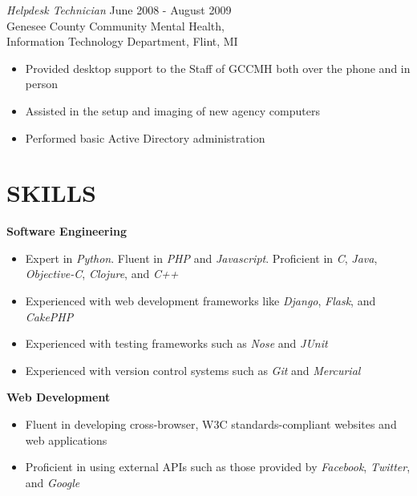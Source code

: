 \documentclass[line,margin]{res}
\begin{document}
\begin{resume}
    {\sl Helpdesk Technician}
            \hfill June 2008 - August 2009 \\
                   Genesee County Community Mental Health, \\
                   Information Technology Department, Flint, MI
        \vspace{2 mm}
        \begin{itemize}
            \item Provided desktop support to the Staff of GCCMH both
                  over the phone and in person
            \item Assisted in the setup and imaging of new agency
                  computers
            \item Performed basic Active Directory administration
        \end{itemize}


\section{SKILLS}
    \textbf{Software Engineering} \vspace{2 mm}
    \begin{itemize}
        \item Expert in {\sl Python}.
              Fluent in {\sl PHP} and {\sl Javascript}.
              Proficient in {\sl C}, {\sl Java}, {\sl Objective-C},
                {\sl Clojure}, and {\sl C++}
        \item Experienced with web development frameworks like {\sl Django},
              {\sl Flask}, and {\sl CakePHP}
        \item Experienced with testing frameworks such as {\sl Nose} and {\sl JUnit}
        \item Experienced with version control systems such as {\sl Git} and {\sl Mercurial}
    \end{itemize}

    \textbf{Web Development} \vspace{2 mm}
    \begin{itemize}
        \item Fluent in developing cross-browser, W3C standards-compliant websites
              and web applications
        \item Proficient in using external APIs such as those provided by {\sl Facebook},
              {\sl Twitter}, and {\sl Google}
    \end{itemize}


\end{resume}
\end{document}
